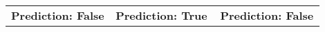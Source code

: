 \begin{table*}[t]
\begin{tabular}{@{}p{0.3\linewidth} p{0.3\linewidth} p{0.3\linewidth} @{}}
\textbf{Prediction: False}                                                                                                                                                                                                                                                                                                                                                                                                                                                                                                                                                                                                                                                                                                                                                                                                                                                                                                                                                                                                                                                                                                                                                                 & {\textbf{Prediction:  \color[HTML]{FE0000}  True}}                                                                                                                                                                                                                                                                                                                                                                                                                                                                                                                                                                                                                                                                                                                                                                                                                                                                                                                                                                                                                                                                                                                                                                                            & \textbf{Prediction: False}                                                                                                                                                                                                                                                                                                                                                                                                                                                                                                                                                                                                                                                                                                                                                                                                                                                                                                    
\end{tabular}
\end{table*}
